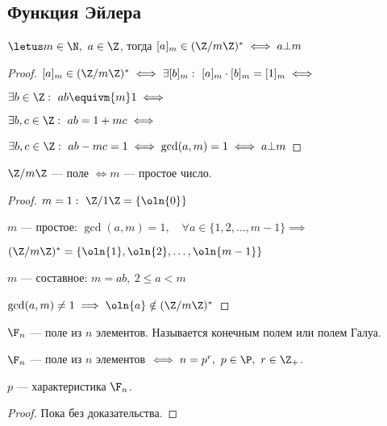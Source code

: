 \subsection{Функция Эйлера}

\begin{theorem-non}
    $\letus m \in \N,~ a \in \Z$, тогда $[a]_m \in (\Z/m\Z)^* \iff a \bot m$
\end{theorem-non}

\begin{proof}
    
    $[a]_m \in (\Z/m\Z)^* \iff \exists [b]_m:~[a]_m \cdot [b]_m = [1]_m \iff$
    
    $\exists b \in \Z:~ab \equivm{m} 1 \iff$
    
    $\exists b, c \in \Z:~ab = 1 + mc \iff$
    
    $\exists b, c \in \Z:~ab - mc = 1 \iff \gcd(a, m) = 1 \iff a \bot m$
\end{proof}

\begin{follow}
    $\Z/m\Z$ --- поле $\iff m$ --- простое число.
\end{follow}

\begin{proof}

    $m = 1:\ \Z/1\Z = \{\oln{0}\}$
    
    $m$ --- простое: $\gcd(a, m) = 1, \quad \forall a \in \{1, 2, \ldots, m-1\} \implies$
    
    $(\Z/m\Z)^* = \{\oln{1}, \oln{2}, \ldots, \oln{m-1}\}$
    
    $m$ --- составное: $m = ab,~2 \leq a < m$
    
    $\gcd(a, m) \neq 1 \implies \oln{a} \notin (\Z/m\Z)^*$
\end{proof}

\begin{defn}
    $\F_{n}$ --- поле из $n$ элементов. Называется конечным полем или полем Галуа.
\end{defn}

\begin{theorem-non}
    $\F_{n}$ --- поле из $n$ элементов $\iff n = p^r,~ p \in \P,~ r \in \Z_{+}$.

    $p$ --- характеристика $\F_{n}$.
\end{theorem-non}

\begin{proof}
    Пока без доказательства.
\end{proof}

